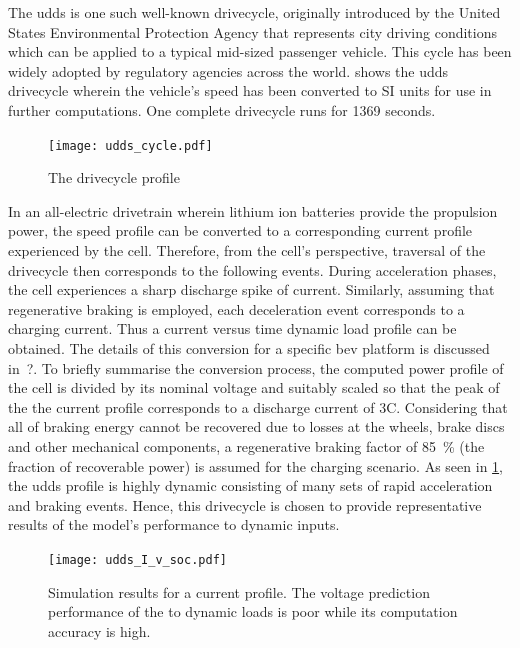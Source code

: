 The \gls{udds} is  one such well-known drivecycle, originally  introduced by the
United  States  Environmental Protection  Agency  that  represents city  driving
conditions which can  be applied to a typical mid-sized  passenger vehicle. This
cycle  has  been  widely  adopted  by  regulatory  agencies  across  the  world.
  shows  the  \gls{udds} drivecycle  wherein  the
vehicle's speed has been converted to  SI units for use in further computations.
One complete drivecycle runs for 1369 seconds.

\begin{figure}[!htbp]
    \centering
    \texttt{[image: udds\_cycle.pdf]}
    \caption{The  drivecycle profile}
    \label{fig:uddsspeedvstimecycle}
\end{figure}

In  an  all-electric  drivetrain  wherein  lithium  ion  batteries  provide  the
propulsion power, the speed profile can  be converted to a corresponding current
profile  experienced  by  the  cell. Therefore,  from  the  cell's  perspective,
traversal of  the drivecycle  then corresponds to  the following  events. During
acceleration phases,  the cell experiences  a sharp discharge spike  of current.
Similarly,  assuming that  regenerative braking  is employed,  each deceleration
event corresponds to a charging current. Thus a current versus time dynamic load
profile can be obtained. The details of this conversion for a specific \gls{bev}
platform is  discussed in~?. To
briefly summarise the conversion process, the computed power profile of the cell
is divided by  its nominal voltage and  suitably scaled so that the  peak of the
the current profile  corresponds to a discharge current of  3C. Considering that
all of  braking energy cannot  be recovered due to  losses at the  wheels, brake
discs  and  other  mechanical  components,  a  regenerative  braking  factor  of
\SI{85}{\percent}  (the  fraction  of  recoverable power)  is  assumed  for  the
charging  scenario. As  seen in \cref{fig:uddsspeedvstimecycle},  the \gls{udds}
profile is  highly dynamic  consisting of  many sets  of rapid  acceleration and
braking  events. Hence,  this  drivecycle is  chosen  to provide  representative
results of the model's performance to dynamic inputs.

\begin{figure}[!htbp]
    \centering
    \texttt{[image: udds\_I\_v\_soc.pdf]} %
    \caption[Simulation results of  and 
    models to  current profile]{Simulation results for a
         current profile. The voltage prediction performance
        of the  to dynamic loads is poor while its
     computation accuracy is high.}
    \label{fig:uddssimp2dspmresults}
\end{figure}

